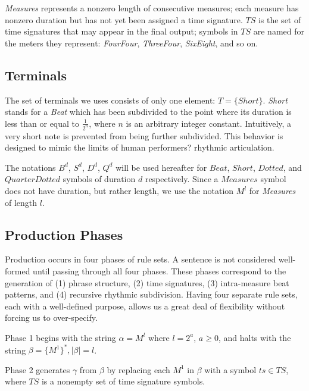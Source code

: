 \documentclass{article}
\begin{document}

\emph{Measures} represents a nonzero length of consecutive measures; each measure has nonzero duration but has not yet been assigned a time signature. $TS$ is the set of time signatures that may appear in the final output; symbols in $TS$ are named for the meters they represent: \emph{FourFour}, \emph{ThreeFour}, \emph{SixEight}, and so on. 
 
\subsection{Terminals}

The set of terminals we uses consists of only one element: $T=\{Short\}$. \emph{Short} stands for a \emph{Beat} which has been subdivided to the point where its duration is less than or equal to $\frac{1}{2^n}$, where $n$ is an arbitrary integer constant. Intuitively, a very short note is prevented from being further subdivided. This behavior is designed to mimic the limits of human performers? rhythmic articulation.

The notations $B^d$, $S^d$, $D^d$, $Q^d$ will be used hereafter for $Beat$, $Short$, $Dotted$, and $QuarterDotted$ symbols of duration $d$ respectively. Since a $Measures$ symbol does not have duration, but rather length, we use the notation $M^l$ for \emph{Measures} of length $l$.

\subsection{Production Phases}

Production occurs in four phases of rule sets. A sentence is not considered well-formed until passing through all four phases. These phases correspond to the generation of (1) phrase structure, (2) time signatures, (3) intra-measure beat patterns, and (4) recursive rhythmic subdivision. Having four separate rule sets, each with a well-defined purpose, allows us a great deal of flexibility without forcing us to over-specify.

Phase 1 begins with the string $\alpha = M^l$ where $l=2^a$, $a \geq 0$, and halts with the string $\beta = \{ M^1 \}^*, |\beta| = l$.

Phase 2 generates $\gamma$ from $\beta$ by replacing each $M^1$ in $\beta$ with a symbol $ts \in TS$, where $TS$ is a nonempty set of time signature symbols.
\end{document}
